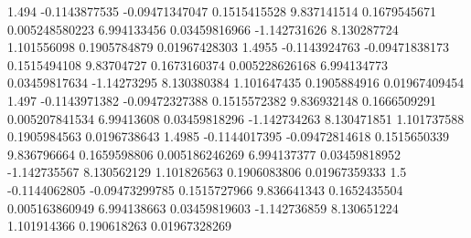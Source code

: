 {1.494 -0.1143877535 -0.09471347047 0.1515415528 9.837141514 0.1679545671 0.005248580223 6.994133456 0.03459816966 -1.142731626 8.130287724 1.101556098 0.1905784879 0.01967428303
1.4955 -0.1143924763 -0.09471838173 0.1515494108 9.83704727 0.1673160374 0.005228626168 6.994134773 0.03459817634 -1.14273295 8.130380384 1.101647435 0.1905884916 0.01967409454
1.497 -0.1143971382 -0.09472327388 0.1515572382 9.836932148 0.1666509291 0.005207841534 6.99413608 0.03459818296 -1.142734263 8.130471851 1.101737588 0.1905984563 0.0196738643
1.4985 -0.1144017395 -0.09472814618 0.1515650339 9.836796664 0.1659598806 0.005186246269 6.994137377 0.03459818952 -1.142735567 8.130562129 1.101826563 0.1906083806 0.01967359333
1.5 -0.1144062805 -0.09473299785 0.1515727966 9.836641343 0.1652435504 0.005163860949 6.994138663 0.03459819603 -1.142736859 8.130651224 1.101914366 0.190618263 0.01967328269
}\eventdata
